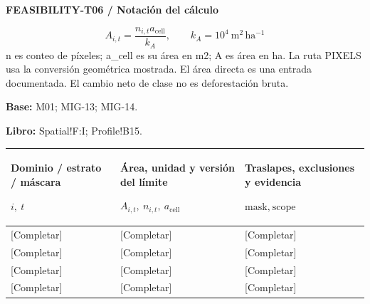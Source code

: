 \ProjectMapBox
{}
\par\begingroup\sffamily\fontsize{8}{10}\selectfont\color{NEBGreen}\setlength{\parskip}{2pt}\setlength{\abovedisplayskip}{4pt}\setlength{\belowdisplayskip}{4pt}\setlength{\abovedisplayshortskip}{2pt}\setlength{\belowdisplayshortskip}{3pt}
\textbf{FEASIBILITY-T06 / Notación del cálculo}\par
{\fontsize{9}{11}\selectfont\[ A_{i,t}=\frac{n_{i,t}a_{\mathrm{cell}}}{k_A},\qquad k_A=10^4\ \mathrm{m^2\,ha^{-1}} \]}
n es conteo de píxeles; a\_cell es su área en m2; A es área en ha. La ruta PIXELS usa la conversión geométrica mostrada. El área directa es una entrada documentada. El cambio neto de clase no es deforestación bruta.\par
\textbf{Base:} M01; MIG-13; MIG-14.\par
\textbf{Libro:} Spatial!F:I; Profile!B15.\par\endgroup
{\sffamily\fontsize{8.3}{10.3}\selectfont\begin{longtable}{@{}P{51.14mm} P{54.44mm} P{59.39mm}@{}}
\toprule
\textbf{Dominio / estrato / máscara}\par {\normalfont\fontsize{8.2}{10}\selectfont $i,\ t$} & \textbf{Área, unidad y versión del límite}\par {\normalfont\fontsize{8.2}{10}\selectfont $A_{i,t},\ n_{i,t},\ a_{\mathrm{cell}}$} & \textbf{Traslapes, exclusiones y evidencia}\par {\normalfont\fontsize{8.2}{10}\selectfont $\text{mask},\ \text{scope}$}\\\midrule\endhead
\rule{0pt}{7.7mm}[Completar] & [Completar] & [Completar]\\\hline
\rule{0pt}{7.7mm}[Completar] & [Completar] & [Completar]\\\hline
\rule{0pt}{7.7mm}[Completar] & [Completar] & [Completar]\\\hline
\rule{0pt}{7.7mm}[Completar] & [Completar] & [Completar]\\\hline
\end{longtable}}
